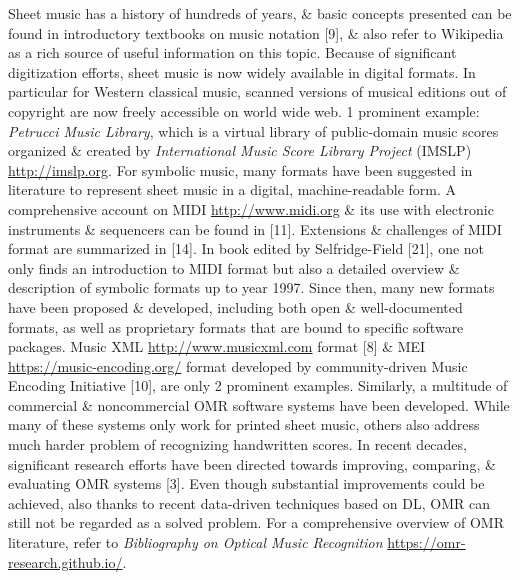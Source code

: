 \documentclass{article}
\begin{document}
\begin{itemize}
\begin{itemize}
		Sheet music has a history of hundreds of years, \& basic concepts presented can be found in introductory textbooks on music notation [9], \& also refer to Wikipedia as a rich source of useful information on this topic. Because of significant digitization efforts, sheet music is now widely available in digital formats. In particular for Western classical music, scanned versions of musical editions out of copyright are now freely accessible on world wide web. 1 prominent example: {\it Petrucci Music Library}, which is a virtual library of public-domain music scores organized \& created by {\it International Music Score Library Project} (IMSLP) \url{http://imslp.org}. For symbolic music, many formats have been suggested in literature to represent sheet music in a digital, machine-readable form. A comprehensive account on MIDI \url{http://www.midi.org} \& its use with electronic instruments \& sequencers can be found in [11]. Extensions \& challenges of MIDI format are summarized in [14]. In book edited by Selfridge-Field [21], one not only finds an introduction to MIDI format but also a detailed overview \& description of symbolic formats up to year 1997. Since then, many new formats have been proposed \& developed, including both open \& well-documented formats, as well as proprietary formats that are bound to specific software packages. Music XML \url{http://www.musicxml.com} format [8] \& MEI \url{https://music-encoding.org/} format developed by community-driven Music Encoding Initiative [10], are only 2 prominent examples. Similarly, a multitude of commercial \& noncommercial OMR software systems have been developed. While many of these systems only work for printed sheet music, others also address much harder problem of recognizing handwritten scores. In recent decades, significant research efforts have been directed towards improving, comparing, \& evaluating OMR systems [3]. Even though substantial improvements could be achieved, also thanks to recent data-driven techniques based on DL, OMR can still not be regarded as a solved problem. For a comprehensive overview of OMR literature, refer to {\it Bibliography on Optical Music Recognition} \url{https://omr-research.github.io/}.
		

\end{itemize}
\end{itemize}
\end{document}
